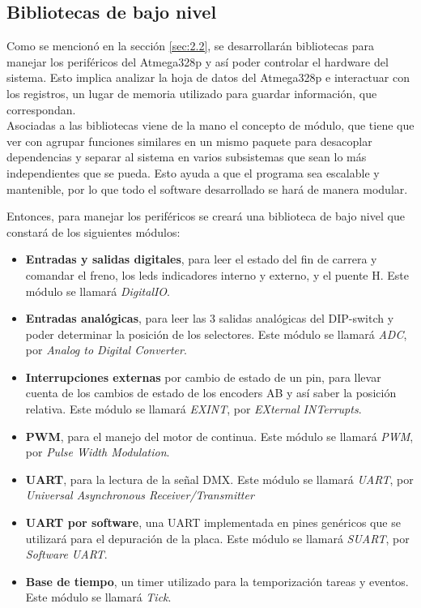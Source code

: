 \subsection{Bibliotecas de bajo nivel}
Como se mencionó en la sección \ref{sec:2.2}, se desarrollarán bibliotecas para manejar los periféricos del Atmega328p y así poder controlar el hardware del sistema. Esto implica analizar la hoja de datos del Atmega328p \cite{sec2_6_2-2} e interactuar con los registros, un lugar de memoria utilizado para guardar información, que correspondan.\\ 
Asociadas a las bibliotecas viene de la mano el concepto de módulo, que tiene que ver con agrupar funciones similares en un mismo paquete para desacoplar dependencias y separar al sistema en varios subsistemas que sean lo más independientes que se pueda. Esto ayuda a que el programa sea escalable y mantenible, por lo que todo el software desarrollado se hará de manera modular.

Entonces, para manejar los periféricos se creará una biblioteca de bajo nivel que constará de los siguientes módulos:
\begin{itemize}
	\item \textbf{Entradas y salidas digitales}, para leer el estado del fin de carrera y comandar el freno, los leds indicadores interno y externo, y el puente H. Este módulo se llamará \textit{DigitalIO}.
	\item \textbf{Entradas analógicas}, para leer las 3 salidas analógicas del DIP-switch y poder determinar la posición de los selectores. Este módulo se llamará \textit{ADC}, por \textit{Analog to Digital Converter}.
	\item \textbf{Interrupciones externas} por cambio de estado de un pin, para llevar cuenta de los cambios de estado de los encoders AB y así saber la posición relativa. Este módulo se llamará \textit{EXINT}, por \textit{EXternal INTerrupts}.
	\item \textbf{PWM}, para el manejo del motor de continua. Este módulo se llamará \textit{PWM}, por \textit{Pulse Width Modulation}.
	\item \textbf{UART}, para la lectura de la señal DMX. Este módulo se llamará \textit{UART}, por \textit{Universal Asynchronous Receiver/Transmitter}
	\item \textbf{UART por software}, una UART implementada en pines genéricos que se utilizará para el depuración de la placa. Este módulo se llamará \textit{SUART}, por \textit{Software UART}.
	\item \textbf{Base de tiempo}, un timer utilizado para la temporización tareas y eventos. Este módulo se llamará \textit{Tick}.
\end{itemize}

